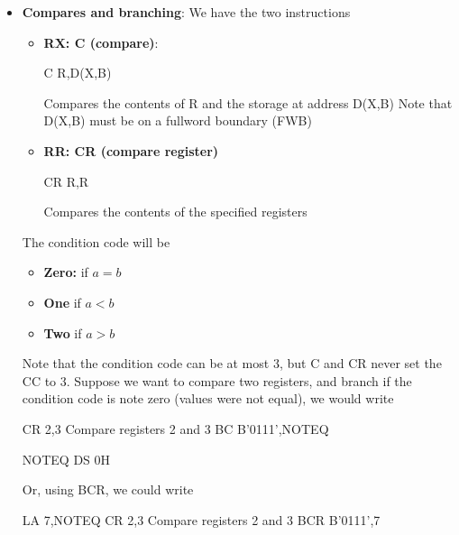 \documentclass{report}
\begin{document}
\begin{itemize}
                \item \textbf{Compares and branching}: We have the two instructions
                    \begin{itemize}
                        \item \textbf{RX: C (compare)}:
                            \bigbreak \noindent 
                            \begin{cppcode}
                            C   R,D(X,B)
                            \end{cppcode}
                            \bigbreak \noindent 
                            Compares the contents of R and the storage at address D(X,B)
                            \bigbreak \noindent 
                            Note that D(X,B) must be on a fullword boundary (FWB)
                        \item \textbf{RR: CR (compare register)} 
                            \bigbreak \noindent 
                            \begin{cppcode}
                            CR  R,R 
                            \end{cppcode}
                            \bigbreak \noindent 
                            Compares the contents of the specified registers
                    \end{itemize}
                    \bigbreak \noindent 
                    The condition code will be
                    \begin{itemize}
                        \item \textbf{Zero:} if $a=b$
                        \item \textbf{One} if $a<b$
                        \item \textbf{Two} if $a>b$
                    \end{itemize}
                    Note that the condition code can be at most 3, but C and CR never set the CC to 3.
                    \bigbreak \noindent 
                    Suppose we want to compare two registers, and branch if the condition code is note zero (values were not equal), we would write
                    \bigbreak \noindent 
                    \begin{cppcode}
                            CR      2,3             Compare registers 2 and 3
                            BC      B'0111',NOTEQ

                    NOTEQ   DS      0H
                    \end{cppcode}
                    \bigbreak \noindent 
                    Or, using BCR, we could write
                    \bigbreak \noindent 
                    \begin{cppcode}
                            LA      7,NOTEQ
                            CR      2,3             Compare registers 2 and 3
                            BCR      B'0111',7


\end{cppcode}
\end{itemize}
\end{document}
